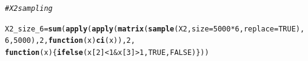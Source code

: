 \documentclass{article}\usepackage[]{graphicx}\usepackage[]{color}
\makeatletter
\newcommand{\hlnum}[1]{\textcolor[rgb]{0.686,0.059,0.569}{#1}}%
\newcommand{\hlcom}[1]{\textcolor[rgb]{0.678,0.584,0.686}{\textit{#1}}}%
\newcommand{\hlopt}[1]{\textcolor[rgb]{0,0,0}{#1}}%
\newcommand{\hlstd}[1]{\textcolor[rgb]{0.345,0.345,0.345}{#1}}%
\newcommand{\hlkwa}[1]{\textcolor[rgb]{0.161,0.373,0.58}{\textbf{#1}}}%
\newcommand{\hlkwb}[1]{\textcolor[rgb]{0.69,0.353,0.396}{#1}}%
\newcommand{\hlkwc}[1]{\textcolor[rgb]{0.333,0.667,0.333}{#1}}%
\newcommand{\hlkwd}[1]{\textcolor[rgb]{0.737,0.353,0.396}{\textbf{#1}}}%
\newenvironment{kframe}{%
 \def\at@end@of@kframe{}%
 \ifinner\ifhmode%
  \def\at@end@of@kframe{\end{minipage}}%
  \begin{minipage}{\columnwidth}%
 \fi\fi%
 \def\FrameCommand##1{\hskip\@totalleftmargin \hskip-\fboxsep
 \colorbox{shadecolor}{##1}\hskip-\fboxsep
     \hskip-\linewidth \hskip-\@totalleftmargin \hskip\columnwidth}%
 \MakeFramed {\advance\hsize-\width
   \@totalleftmargin\z@ \linewidth\hsize
   \@setminipage}}%
 {\par\unskip\endMakeFramed%
 \at@end@of@kframe}
\newenvironment{knitrout}{}{} %
\makeatother
\begin{document}
\begin{knitrout}
\color{fgcolor}\begin{kframe}
\begin{alltt}
\hlcom{#X2 sampling }

\hlstd{X2_size_6} \hlkwb{=} \hlkwd{sum}\hlstd{(}\hlkwd{apply}\hlstd{(}\hlkwd{apply}\hlstd{(}\hlkwd{matrix}\hlstd{(}\hlkwd{sample}\hlstd{(X2,} \hlkwc{size} \hlstd{=} \hlnum{5000} \hlopt{*}\hlnum{6}\hlstd{,} \hlkwc{replace} \hlstd{=} \hlnum{TRUE}\hlstd{),}
                                   \hlnum{6}\hlstd{,}\hlnum{5000}\hlstd{),} \hlnum{2}\hlstd{,} \hlkwa{function}\hlstd{(}\hlkwc{x}\hlstd{)} \hlkwd{ci}\hlstd{(x)),} \hlnum{2}\hlstd{,}
                      \hlkwa{function}\hlstd{(}\hlkwc{x}\hlstd{)\{}\hlkwd{ifelse}\hlstd{(x[}\hlnum{2}\hlstd{]} \hlopt{<} \hlnum{1} \hlopt{&} \hlstd{x[}\hlnum{3}\hlstd{]} \hlopt{>} \hlnum{1}\hlstd{,} \hlnum{TRUE}\hlstd{,} \hlnum{FALSE}\hlstd{)\}))}


\end{alltt}
\end{kframe}
\end{knitrout}
\end{document}
